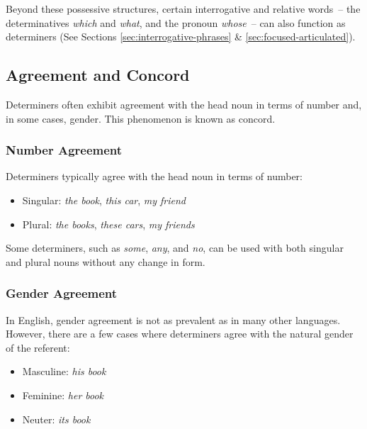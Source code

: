 Beyond these possessive structures, certain interrogative and relative words~-- the determinatives \textit{which} and \textit{what}, and the pronoun \textit{whose}~-- can also function as determiners (See Sections \ref{sec:interrogative-phrases} \& \ref{sec:focused-articulated}).

\subsection{Agreement and Concord}

Determiners often exhibit agreement with the head noun in terms of number and, in some cases, gender. This phenomenon is known as concord.

\subsubsection{Number Agreement}
Determiners typically agree with the head noun in terms of number:

\begin{itemize}[noitemsep]
   \item Singular: \textit{the book}, \textit{this car}, \textit{my friend}
   \item Plural: \textit{the books}, \textit{these cars}, \textit{my friends}
\end{itemize}

Some determiners, such as \textit{some}, \textit{any}, and \textit{no}, can be used with both singular and plural nouns without any change in form.

\subsubsection{Gender Agreement}
In English, gender agreement is not as prevalent as in many other languages. However, there are a few cases where determiners agree with the natural gender of the referent:

\begin{itemize}[noitemsep]
   \item Masculine: \textit{his book}
   \item Feminine: \textit{her book}
   \item Neuter: \textit{its book}
\end{itemize}


